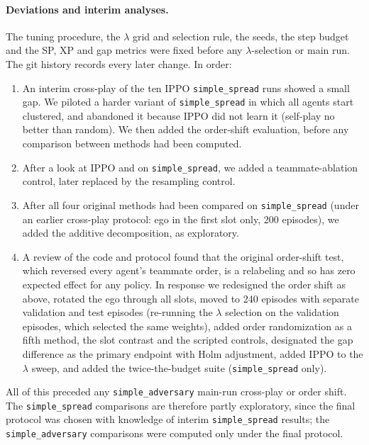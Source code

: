 \paragraph{Deviations and interim analyses.}
The tuning procedure, the $\lambda$ grid and selection rule, the seeds, the step
budget and the SP, XP and gap metrics were fixed before any $\lambda$-selection
or main run. The git history records every later change. In order:
\begin{enumerate}[leftmargin=1.5em,itemsep=1pt,topsep=2pt]
\item An interim cross-play of the ten IPPO \texttt{simple\_spread} runs showed a
small gap. We piloted a harder variant of \texttt{simple\_spread} in which all
agents start clustered, and abandoned it because IPPO did not learn it
(self-play no better than random). We then added the order-shift evaluation,
before any comparison between methods had been computed.
\item After a look at IPPO and \picr{} on \texttt{simple\_spread}, we added a
teammate-ablation control, later replaced by the resampling control.
\item After all four original methods had been compared on
\texttt{simple\_spread} (under an earlier cross-play protocol: ego in the first
slot only, 200 episodes), we added the additive decomposition, as exploratory.
\item A review of the code and protocol found that the original order-shift
test, which reversed every agent's teammate order, is a relabeling and so has
zero expected effect for any policy. In response we redesigned the order shift
as above, rotated the ego through all slots, moved to 240 episodes with separate
validation and test episodes (re-running the $\lambda$ selection on the
validation episodes, which selected the same weights), added order
randomization as a fifth method, the slot contrast and the scripted controls,
designated the gap difference as the primary endpoint with Holm adjustment,
added IPPO to the $\lambda$ sweep, and added the twice-the-budget suite
(\texttt{simple\_spread} only).
\end{enumerate}
All of this preceded any \texttt{simple\_adversary} main-run cross-play or order
shift. The \texttt{simple\_spread} comparisons are therefore partly exploratory,
since the final protocol was chosen with knowledge of interim
\texttt{simple\_spread} results; the \texttt{simple\_adversary} comparisons were
computed only under the final protocol.
